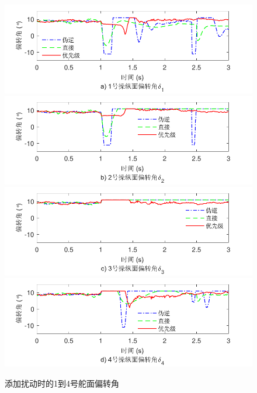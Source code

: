 \begin{figure}[htbp]
	\centering	
	\includegraphics[scale=1]{Fig/Fig14a.pdf}
	\includegraphics[scale=1]{Fig/Fig14b.pdf}
	\includegraphics[scale=1]{Fig/Fig14c.pdf}
	\includegraphics[scale=1]{Fig/Fig14d.pdf}
	\caption{\label{fig_Deflection_angle_with_d}添加扰动时的1到4号舵面偏转角}
\end{figure}
